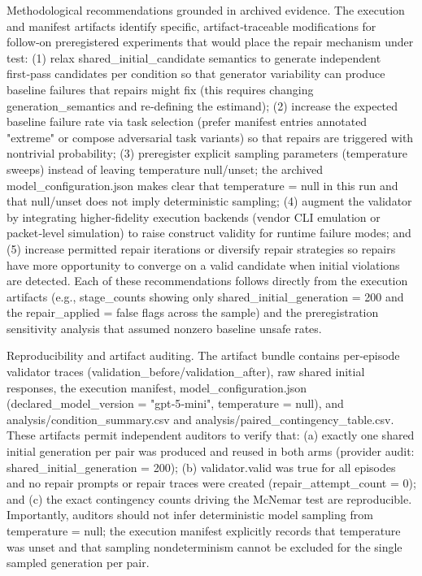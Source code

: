 \documentclass[conference]{IEEEtran}
\begin{document}
Methodological recommendations grounded in archived evidence. The execution and manifest artifacts identify specific, artifact‑traceable modifications for follow‑on preregistered experiments that would place the repair mechanism under test: (1) relax shared\_initial\_candidate semantics to generate independent first‑pass candidates per condition so that generator variability can produce baseline failures that repairs might fix (this requires changing generation\_semantics and re‑defining the estimand); (2) increase the expected baseline failure rate via task selection (prefer manifest entries annotated "extreme" or compose adversarial task variants) so that repairs are triggered with nontrivial probability; (3) preregister explicit sampling parameters (temperature sweeps) instead of leaving temperature null/unset; the archived model\_configuration.json makes clear that temperature = null in this run and that null/unset does not imply deterministic sampling; (4) augment the validator by integrating higher‑fidelity execution backends (vendor CLI emulation or packet‑level simulation) to raise construct validity for runtime failure modes; and (5) increase permitted repair iterations or diversify repair strategies so repairs have more opportunity to converge on a valid candidate when initial violations are detected. Each of these recommendations follows directly from the execution artifacts (e.g., stage\_counts showing only shared\_initial\_generation = 200 and the repair\_applied = false flags across the sample) and the preregistration sensitivity analysis that assumed nonzero baseline unsafe rates.

Reproducibility and artifact auditing. The artifact bundle contains per‑episode validator traces (validation\_before/validation\_after), raw shared initial responses, the execution manifest, model\_configuration.json (declared\_model\_version = "gpt‑5‑mini", temperature = null), and analysis/condition\_summary.csv and analysis/paired\_contingency\_table.csv. These artifacts permit independent auditors to verify that: (a) exactly one shared initial generation per pair was produced and reused in both arms (provider audit: shared\_initial\_generation = 200); (b) validator.valid was true for all episodes and no repair prompts or repair traces were created (repair\_attempt\_count = 0); and (c) the exact contingency counts driving the McNemar test are reproducible. Importantly, auditors should not infer deterministic model sampling from temperature = null; the execution manifest explicitly records that temperature was unset and that sampling nondeterminism cannot be excluded for the single sampled generation per pair.
\end{document}
